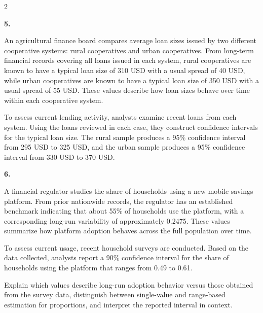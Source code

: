 \documentclass[12pt]{article}
\newcommand{\SubsectionBox}[1]{%
	\noindent\colorbox{gray!30}{%
		\parbox{\linewidth}{\textbf{#1}}%
	}\par\vspace{0.35cm}%
}
\begin{document}
\begin{multicols}{2}
		\vspace{0.25cm}
		\SubsectionBox{5.}\vspace{-0.25cm}
		An agricultural finance board compares average loan sizes issued by two different cooperative systems: rural cooperatives and urban cooperatives. From long-term financial records covering all loans issued in each system, rural cooperatives are known to have a typical loan size of 310 USD with a usual spread of 40 USD, while urban cooperatives are known to have a typical loan size of 350 USD with a usual spread of 55 USD. These values describe how loan sizes behave over time within each cooperative system.

		To assess current lending activity, analysts examine recent loans from each system. Using the loans reviewed in each case, they construct confidence intervals for the typical loan size. The rural sample produces a 95\% confidence interval from 295 USD to 325 USD, and the urban sample produces a 95\% confidence interval from 330 USD to 370 USD.

		\vspace{0.25cm}
		\SubsectionBox{6.}\vspace{-0.25cm}
		A financial regulator studies the share of households using a new mobile savings platform. From prior nationwide records, the regulator has an established benchmark indicating that about 55\% of households use the platform, with a corresponding long-run variability of approximately 0.2475. These values summarize how platform adoption behaves across the full population over time.

		To assess current usage, recent household surveys are conducted. Based on the data collected, analysts report a 90\% confidence interval for the share of households using the platform that ranges from 0.49 to 0.61.

		Explain which values describe long-run adoption behavior versus those obtained from the survey data, distinguish between single-value and range-based estimation for proportions, and interpret the reported interval in context.
	\end{multicols}
\end{document}
